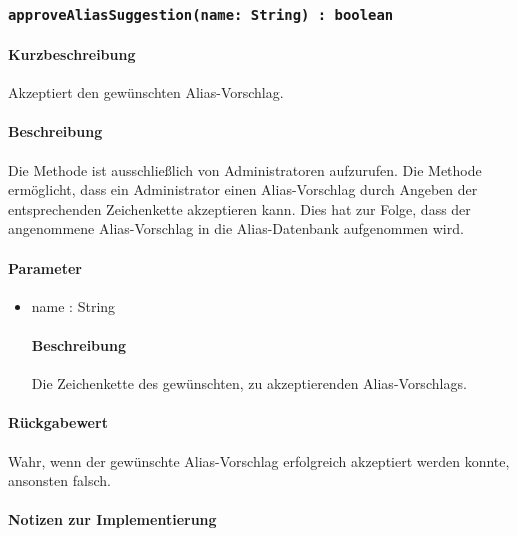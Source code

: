 \subsubsection{\texttt{approveAliasSuggestion(name: String) : boolean}}%
\paragraph*{Kurzbeschreibung}
Akzeptiert den gewünschten Alias-Vorschlag.
\paragraph*{Beschreibung}
Die Methode ist ausschließlich von Administratoren aufzurufen.
Die Methode ermöglicht, dass ein Administrator einen Alias-Vorschlag durch Angeben der entsprechenden Zeichenkette akzeptieren kann.
Dies hat zur Folge, dass der angenommene Alias-Vorschlag in die Alias-Datenbank aufgenommen wird.
\paragraph*{Parameter}
\begin{itemize}
	\item name : String
		\paragraph*{Beschreibung}
		Die Zeichenkette des gewünschten, zu akzeptierenden Alias-Vorschlags.
\end{itemize}
\paragraph*{Rückgabewert}
Wahr, wenn der gewünschte Alias-Vorschlag erfolgreich akzeptiert werden konnte, ansonsten falsch.

\paragraph*{Notizen zur Implementierung}%
